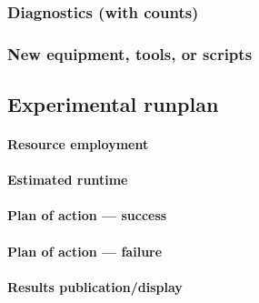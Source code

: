 \documentclass[11pt]{article}
\theoremstyle{plain}
\theoremstyle{remark}
\begin{document}
\subsubsection*{Diagnostics (with counts)}

\subsubsection*{New equipment, tools, or scripts}

\subsection{Experimental runplan} %

\paragraph{Resource employment}

\paragraph{Estimated runtime}

\paragraph{Plan of action — success}

\paragraph{Plan of action — failure}

\paragraph{Results publication/display}

\end{document}
